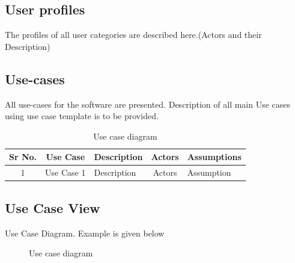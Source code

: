 \documentclass[oneside,a4paper,12pt]{report}
\begin{document}
\begin{table}[!htbp]
 \subsection{User profiles}
The profiles of all user categories are described here.(Actors and their Description)

\subsection{Use-cases}
All use-cases for the software are presented. Description of all main Use cases using use case template is to be provided.

\begin{table}[!htbp]
\begin{center}
\def\arraystretch{1.5}
\begin{tabularx}{\textwidth}{| c | c | X | c | X |}
\hline
Sr No.	& Use Case	& Description	& Actors	& Assumptions \\
\hline
1& Use Case 1 & Description & Actors & Assumption \\
\hline
\end{tabularx}
\end{center}
\caption{Use Cases}
\label{tab:usecase}
\end{table}


\subsection{Use Case View}
Use Case Diagram. Example is given below
\begin{center}
	\begin{figure}[!htbp]
		\centering
	  \caption{Use case diagram}
	  \label{fig:usecase}
	\end{figure}
\end{center}


\end{table}
\end{document}
